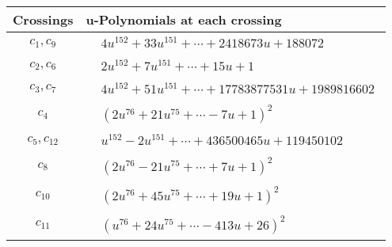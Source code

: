 \documentclass[1p]{elsarticle_modified}
\theoremstyle{definition}
\begin{document}
\begin{tabular}{m{50pt}|m{274pt}}
Crossings & \hspace{64pt}u-Polynomials at each crossing \\
\hline $$\begin{aligned}c_{1},c_{9}\end{aligned}$$&$\begin{aligned}
&4 u^{152}+33 u^{151}+\cdots+2418673 u+188072
\end{aligned}$\\
\hline $$\begin{aligned}c_{2},c_{6}\end{aligned}$$&$\begin{aligned}
&2 u^{152}+7 u^{151}+\cdots+15 u+1
\end{aligned}$\\
\hline $$\begin{aligned}c_{3},c_{7}\end{aligned}$$&$\begin{aligned}
&4 u^{152}+51 u^{151}+\cdots+17783877531 u+1989816602
\end{aligned}$\\
\hline $$\begin{aligned}c_{4}\end{aligned}$$&$\begin{aligned}
&(2 u^{76}+21 u^{75}+\cdots-7 u+1)^{2}
\end{aligned}$\\
\hline $$\begin{aligned}c_{5},c_{12}\end{aligned}$$&$\begin{aligned}
&u^{152}-2 u^{151}+\cdots+436500465 u+119450102
\end{aligned}$\\
\hline $$\begin{aligned}c_{8}\end{aligned}$$&$\begin{aligned}
&(2 u^{76}-21 u^{75}+\cdots+7 u+1)^{2}
\end{aligned}$\\
\hline $$\begin{aligned}c_{10}\end{aligned}$$&$\begin{aligned}
&(2 u^{76}+45 u^{75}+\cdots+19 u+1)^{2}
\end{aligned}$\\
\hline $$\begin{aligned}c_{11}\end{aligned}$$&$\begin{aligned}
&(u^{76}+24 u^{75}+\cdots-413 u+26)^{2}
\end{aligned}$\\
\hline
\end{tabular}\\~\\
\end{document}
